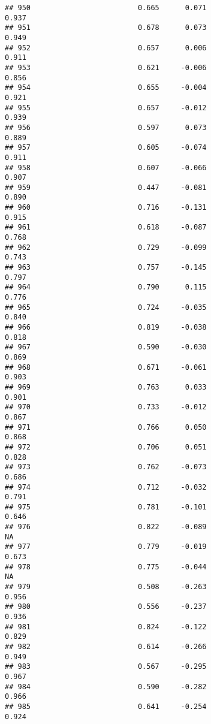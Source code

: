 \documentclass[
]{article}
\begin{document}
\begin{verbatim}
## 950                         0.665      0.071                     0.937
## 951                         0.678      0.073                     0.949
## 952                         0.657      0.006                     0.911
## 953                         0.621     -0.006                     0.856
## 954                         0.655     -0.004                     0.921
## 955                         0.657     -0.012                     0.939
## 956                         0.597      0.073                     0.889
## 957                         0.605     -0.074                     0.911
## 958                         0.607     -0.066                     0.907
## 959                         0.447     -0.081                     0.890
## 960                         0.716     -0.131                     0.915
## 961                         0.618     -0.087                     0.768
## 962                         0.729     -0.099                     0.743
## 963                         0.757     -0.145                     0.797
## 964                         0.790      0.115                     0.776
## 965                         0.724     -0.035                     0.840
## 966                         0.819     -0.038                     0.818
## 967                         0.590     -0.030                     0.869
## 968                         0.671     -0.061                     0.903
## 969                         0.763      0.033                     0.901
## 970                         0.733     -0.012                     0.867
## 971                         0.766      0.050                     0.868
## 972                         0.706      0.051                     0.828
## 973                         0.762     -0.073                     0.686
## 974                         0.712     -0.032                     0.791
## 975                         0.781     -0.101                     0.646
## 976                         0.822     -0.089                        NA
## 977                         0.779     -0.019                     0.673
## 978                         0.775     -0.044                        NA
## 979                         0.508     -0.263                     0.956
## 980                         0.556     -0.237                     0.936
## 981                         0.824     -0.122                     0.829
## 982                         0.614     -0.266                     0.949
## 983                         0.567     -0.295                     0.967
## 984                         0.590     -0.282                     0.966
## 985                         0.641     -0.254                     0.924

\end{verbatim}
\end{document}
